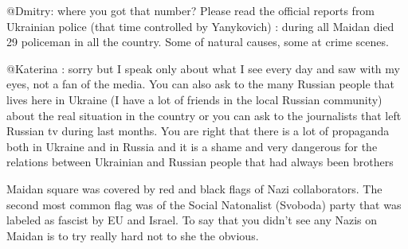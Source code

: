 \begin{itemize}
\begin{itemize}

@Dmitry: where you got that number? Please read the official reports from
Ukrainian police (that time controlled by Yanykovich) : during all Maidan died
29 policeman in all the country. Some of natural causes, some at crime scenes.


@Katerina : sorry but I speak only about what I see every day and saw with my
eyes, not a fan of the media. You can also ask to the many Russian people that
lives here in Ukraine (I have a lot of friends in the local Russian community)
about the real situation in the country or you can ask to the journalists that
left Russian tv during last months. You are right that there is a lot of
propaganda both in Ukraine and in Russia and it is a shame and very dangerous
for the relations between Ukrainian and Russian people that had always been
brothers


Maidan square was covered by red and black flags of Nazi collaborators. The
second most common flag was of the Social Natonalist (Svoboda) party that was
labeled as fascist by EU and Israel. To say that you didn't see any Nazis on
Maidan is to try really hard not to she the obvious.



\end{itemize}
\end{itemize}
